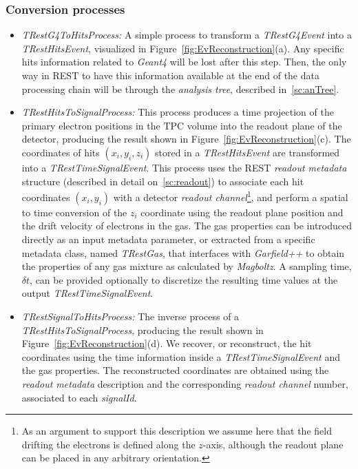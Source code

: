 \subsubsection{ Conversion processes }\label{sc:convPcs}

\begin{itemize}
	\item \emph{TRestG4ToHitsProcess:} A simple process to transform a \emph{TRestG4Event} into a \emph{TRestHitsEvent}, visualized in Figure~\ref{fig:EvReconstruction}(a). Any specific hits information related to \emph{Geant4} will be lost after this step. Then, the only way in REST to have this information available at the end of the data processing chain will be through the \emph{analysis tree}, described in~\ref{sc:anTree}.

\item \emph{TRestHitsToSignalProcess:} This process produces a time projection of the primary electron positions in the TPC volume into the readout plane of the detector, producing the result shown in Figure~\ref{fig:EvReconstruction}(c). The coordinates of hits $(x_i, y_i, z_i)$ stored in a \emph{TRestHitsEvent} are transformed into a \emph{TRestTimeSignalEvent}. This process uses the REST \emph{readout metadata} structure (described in detail on~\ref{sc:readout}) to associate each hit coordinates $(x_i, y_i)$ with a detector \emph{readout channel}\footnote{As an argument to support this description we assume here that the field drifting the electrons is defined along the $z$-axis, although the readout plane can be placed in any arbitrary orientation.}, and perform a spatial to time conversion of the $z_i$ coordinate using the readout plane position and the drift velocity of electrons in the gas. The gas properties can be introduced directly as an input metadata parameter, or extracted from a specific metadata class, named \emph{TRestGas}, that interfaces with \emph{Garfield++} to obtain the properties of any gas mixture as calculated by \emph{Magboltz}. A sampling time, $\delta t$, can be provided optionally to discretize the resulting time values at the output \emph{TRestTimeSignalEvent}.

\item \emph{TRestSignalToHitsProcess:} The inverse process of a \emph{TRestHitsToSignalProcess}, producing the result shown in Figure~\ref{fig:EvReconstruction}(d). We recover, or reconstruct, the hit coordinates using the time information inside a \emph{TRestTimeSignalEvent} and the gas properties. The reconstructed coordinates are obtained using the \emph{readout metadata} description and the corresponding \emph{readout channel} number, associated to each \emph{signalId}.


\end{itemize}
